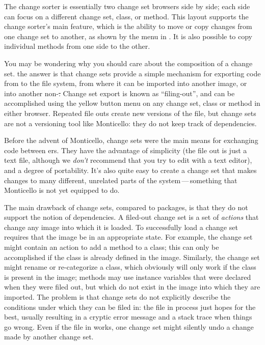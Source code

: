 \documentclass[a4paper,10pt,twoside]{book}
\begin{document}
The change sorter is essentially two change set browsers side by side; each side can focus on a different change set, class, or method.
This layout supports the change sorter's main feature, which is the ability to move or copy changes from one change set to another, as shown by the  menu in .
It is also possible to copy individual methods from one side to the other.

You may be wondering why you should care about the composition of a change set.
the answer is that change sets provide a simple mechanism for exporting code from \sq to the file system, from where it can be imported into another \sq image, or into another non-\sq \st.
Change set export is known as ``filing-out'', and can be accomplished using the yellow button menu on any change set, class or method in either browser.
Repeated file outs create new versions of the file, but change sets are not a versioning tool like Monticello:
they do not keep track of dependencies.

Before the advent of Monticello, change sets were the main means for exchanging code between \sq{}ers.
They have the advantage of simplicity (the file out is just a text file, although we \emph{don't} recommend that you try to edit with a text editor), and a degree of portability.  
It's also quite easy to create a change set that makes changes to many different, unrelated parts of the system\,---\,something that Monticello is not yet equipped to do.

The main drawback of change sets, compared to  packages, is that they do not support the notion of dependencies.
A filed-out change set is a set of \emph{actions} that change any image into which it is loaded. To successfully load a change set requires that the image be in an appropriate state.
For example, the change set might contain an action to add a method to a class; this can only be accomplished if the class is already defined in the image.
Similarly, the change set might rename or re-categorize a class, which obviously will only work if the class is present in the image; methods may use instance variables that were declared when they were filed out, but which do not exist in the image into which they are imported.
The problem is that change sets do not explicitly describe the conditions under which they can be filed in:
the file in process just hopes for the best, usually resulting in a cryptic error message and a stack trace when things go wrong.
Even if the file in works, one change set might silently undo a change made by another change set.
\end{document}
